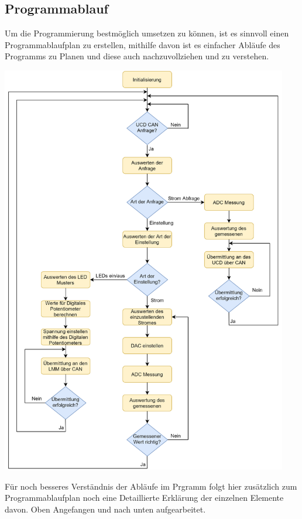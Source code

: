 \documentclass[paper=a4, 12pt]{scrreprt}
\begin{document}
		\subsection{Programmablauf}
		Um die Programmierung bestmöglich umsetzen zu können, ist es sinnvoll einen Programmablaufplan zu erstellen, mithilfe davon ist es einfacher Abläufe des Programms zu Planen und diese auch nachzuvollziehen und zu verstehen.
		\begin{adjustbox}{center,caption={Programmablaufplan},label={fig:PAP.png},nofloat=figure,vspace=\bigskipamount}
			\includegraphics[height=18cm]{img/Dyn-LED-Driver-PAP.png}
		\end{adjustbox}
		Für noch besseres Verständnis der Abläufe im Prgramm folgt hier zusätzlich zum Programmablaufplan noch eine Detaillierte Erklärung der einzelnen Elemente davon. Oben Angefangen und nach unten aufgearbeitet. 
		\newpage
\end{document}
